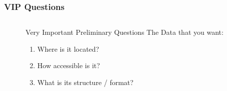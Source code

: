 \documentclass{beamer}\usepackage[]{graphicx}\usepackage[]{color}
\begin{document}

{ %
    \begin{frame}[plain]
     \end{frame}
}


\begin{frame}
\frametitle{VIP Questions}

\begin{columns}[t]
\begin{column}{0.1\textwidth}
\end{column}
\begin{column}{0.8\textwidth}
 \begin{block}{Very Important Preliminary Questions}
 The Data that you want:
 \begin{enumerate}
   \item Where is it located?
   \item How accessible is it?
   \item What is its structure / format? 
  \end{enumerate}
 \end{block}
\end{column}
\begin{column}{0.1\textwidth}
\end{column}
\end{columns}

\end{frame}
\end{document}
